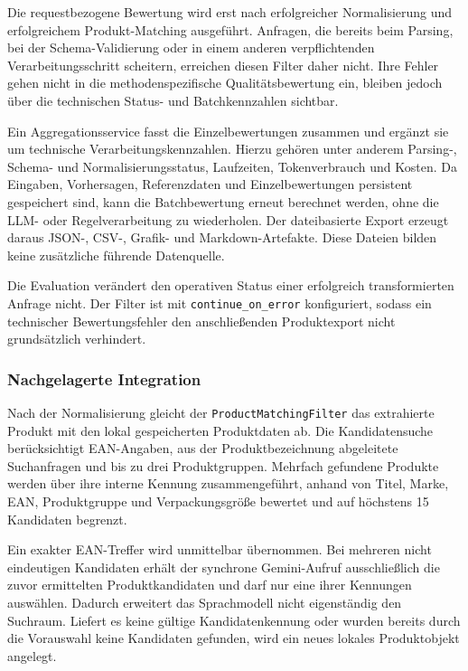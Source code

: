Die requestbezogene Bewertung wird erst nach erfolgreicher Normalisierung und erfolgreichem Produkt-Matching ausgeführt. Anfragen, die bereits beim Parsing, bei 
der Schema-Validierung oder in einem anderen verpflichtenden Verarbeitungsschritt scheitern, erreichen diesen Filter daher nicht. Ihre Fehler gehen nicht in die 
methodenspezifische Qualitätsbewertung ein, bleiben jedoch über die technischen Status- und Batchkennzahlen sichtbar.

Ein Aggregationsservice fasst die Einzelbewertungen zusammen und ergänzt sie um technische Verarbeitungskennzahlen. Hierzu gehören unter anderem Parsing-, Schema- 
und Normalisierungsstatus, Laufzeiten, Tokenverbrauch und Kosten. Da Eingaben, Vorhersagen, Referenzdaten und Einzelbewertungen persistent gespeichert sind, kann 
die Batchbewertung erneut berechnet werden, ohne die LLM- oder Regelverarbeitung zu wiederholen. Der dateibasierte Export erzeugt daraus JSON-, CSV-, Grafik- und 
Markdown-Artefakte. Diese Dateien bilden keine zusätzliche führende Datenquelle.

Die Evaluation verändert den operativen Status einer erfolgreich transformierten Anfrage nicht. Der Filter ist mit \texttt{continue\_on\_error} konfiguriert, 
sodass ein technischer Bewertungsfehler den anschließenden Produktexport nicht grundsätzlich verhindert.

\subsubsection{Nachgelagerte Integration}

Nach der Normalisierung gleicht der \texttt{ProductMatchingFilter} das extrahierte Produkt mit den lokal gespeicherten Produktdaten ab. Die Kandidatensuche 
berücksichtigt EAN-Angaben, aus der Produktbezeichnung abgeleitete Suchanfragen und bis zu drei Produktgruppen. Mehrfach gefundene Produkte werden über ihre 
interne Kennung zusammengeführt, anhand von Titel, Marke, EAN, Produktgruppe und Verpackungsgröße bewertet und auf höchstens 15 Kandidaten begrenzt.

Ein exakter EAN-Treffer wird unmittelbar übernommen. Bei mehreren nicht eindeutigen Kandidaten erhält der synchrone Gemini-Aufruf ausschließlich die zuvor 
ermittelten Produktkandidaten und darf nur eine ihrer Kennungen auswählen. Dadurch erweitert das Sprachmodell nicht eigenständig den Suchraum. Liefert es 
keine gültige Kandidatenkennung oder wurden bereits durch die Vorauswahl keine Kandidaten gefunden, wird ein neues lokales Produktobjekt angelegt.

